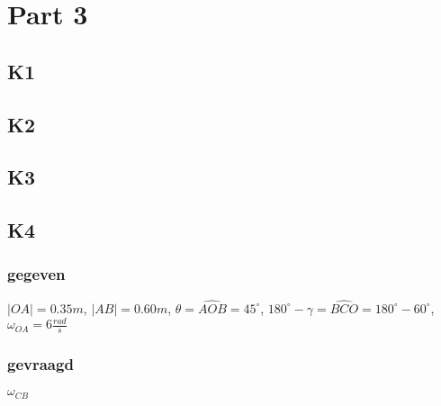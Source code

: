 \documentclass[10pt,a4paper]{article}
\begin{document}
\section{Part 3}
\subsection{K1}

\subsection{K2}

\subsection{K3}

\subsection{K4}
\subsubsection*{gegeven}
$|OA|=0.35m$, $|AB| = 0.60m$, $\theta = \hat{AOB} = 45^\circ$, $180^\circ-\gamma = \hat{BCO} = 180^\circ-60^\circ$, $\omega_{OA} = 6\frac{rad}{s}$
\subsubsection*{gevraagd}
$\omega_{CB}$
\end{document}
